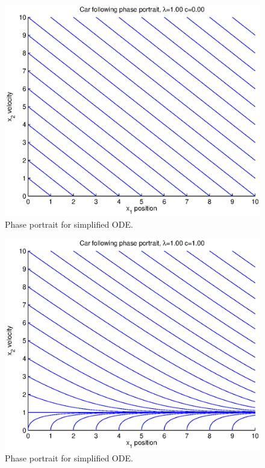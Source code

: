 \documentclass[11pt,a4paper]{article}
\begin{document}
\begin{figure}[ht]
\centering
\includegraphics[width=400pt]{phase1-0}
\caption{Phase portrait for simplified ODE.}
\label{phase1-0}
\end{figure}

\begin{figure}[ht]
\centering
\includegraphics[width=400pt]{phase1-1}
\caption{Phase portrait for simplified ODE.}
\label{phase1-1}
\end{figure}
\end{document}
